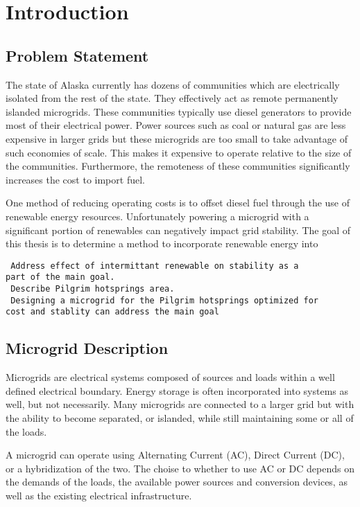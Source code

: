 \chapter{Introduction}

\section{Problem Statement}
The state of Alaska currently has dozens of communities which are electrically isolated from the rest of the state. They effectively act as remote permanently islanded microgrids. These communities typically use diesel generators to provide most of their electrical power. Power sources such as coal or natural gas are less expensive in larger grids but these microgrids are too small to take advantage of such economies of scale. This makes it expensive to operate relative to the size of the communities. Furthermore, the remoteness of these communities significantly increases the cost to import fuel.

One method of reducing operating costs is to offset diesel fuel through the use of renewable energy resources. Unfortunately powering a microgrid with a significant portion of renewables can negatively impact grid stability. The goal of this thesis is to determine a method to incorporate renewable energy into

\begin{verbatim} 
 Address effect of intermittant renewable on stability as a 
part of the main goal.
 Describe Pilgrim hotsprings area.
 Designing a microgrid for the Pilgrim hotsprings optimized for
cost and stablity can address the main goal
\end{verbatim}

\section{Microgrid Description}
Microgrids are electrical systems composed of sources and loads within a well defined electrical boundary. Energy storage is often incorporated into systems as well, but not necessarily. Many microgrids are connected to a larger grid but with the ability to become separated, or islanded, while still maintaining some or all of the loads.

A microgrid can operate using Alternating Current (AC), Direct Current (DC), or a hybridization of the two. The choise to whether to use AC or DC depends on the demands of the loads, the available power sources and conversion devices, as well as the existing electrical infrastructure.

